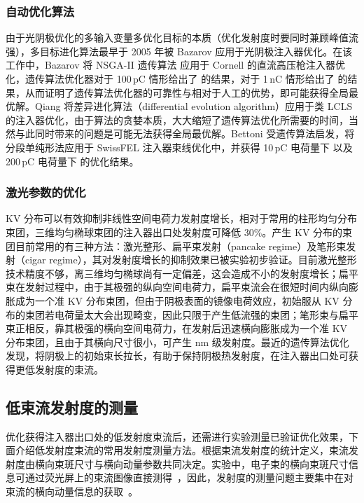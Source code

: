\subsubsection{自动优化算法}
由于光阴极优化的多输入变量多优化目标的本质（优化发射度时要同时兼顾峰值流强），多目标进化算法最早于 2005 年被 Bazarov 应用于光阴极注入器优化\cite{Bazarov:2005aa}。在该工作中，Bazarov 将 NSGA-II 遗传算法\cite{Deb:2002aa} 应用于 Cornell 的直流高压枪注入器优化，遗传算法优化器对于 100\,pC 情形给出了  的结果，对于 1\,nC 情形给出了  的结果，从而证明了遗传算法优化器的可靠性与相对于人工的优势，即可能获得全局最优解。Qiang 将差异进化算法（differential evolution algorithm）应用于类 LCLS 的注入器优化，由于算法的贪婪本质，大大缩短了遗传算法优化所需要的时间\cite{Qiang:2013aa}，当然与此同时带来的问题是可能无法获得全局最优解。Bettoni 受遗传算法启发，将分段单纯形法应用于 SwissFEL 注入器束线优化中，并获得 10\,pC 电荷量下  以及 200\,pC 电荷量下  的优化结果\cite{Bettoni:2015aa}。

\subsubsection{激光参数的优化}
KV 分布\cite{Kapchinskij:1959aa}可以有效抑制非线性空间电荷力发射度增长\cite{Limborg-Deprey:2006aa,Khojoyan:2013aa}，相对于常用的柱形均匀分布束团，三维均匀椭球束团的注入器出口处发射度可降低 30\%\cite{Khojoyan:2014aa}。产生 KV 分布的束团目前常用的有三种方法：激光整形、扁平束发射（pancake regime）及笔形束发射（cigar regime），其对发射度增长的抑制效果已被实验初步验证\cite{Khojoyan:2013aa,Khojoyan:2014aa,Musumeci:2008ab,Li:2012aa}。目前激光整形技术精度不够，离三维均匀椭球尚有一定偏差，这会造成不小的发射度增长\cite{Khojoyan:2013aa}；扁平束在发射过程中，由于其极强的纵向空间电荷力，扁平束流会在很短时间内纵向膨胀成为一个准 KV 分布束团，但由于阴极表面的镜像电荷效应，初始服从 KV 分布的束团若电荷量太大会出现畸变，因此只限于产生低流强的束团\cite{Musumeci:2008ab}；笔形束与扁平束正相反，靠其极强的横向空间电荷力，在发射后迅速横向膨胀成为一个准 KV 分布束团，且由于其横向尺寸很小，可产生 nm 级发射度\cite{Li:2012aa}。最近的遗传算法优化发现，将阴极上的初始束长拉长，有助于保持阴极热发射度，在注入器出口处可获得更低发射度的束流\cite{Qian:2016aa}。

\subsection{低束流发射度的测量}
优化获得注入器出口处的低发射度束流后，还需进行实验测量已验证优化效果，下面介绍低发射度束流的常用发射度测量方法。根据束流发射度的统计定义，束流发射度由横向束斑尺寸与横向动量参数共同决定。实验中，电子束的横向束斑尺寸信息可通过荧光屏上的束流图像直接测得~\cite{Graves:1997aa,Walasek-Hohne:2011aa}，因此，发射度的测量问题主要集中在对束流的横向动量信息的获取~\cite{lee2015review}。

